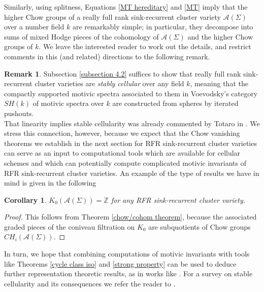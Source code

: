 \documentclass[11pt]{amsart}
\newtheorem{cor}[thm]{Corollary}
\theoremstyle{definition}
\newtheorem{rem}[thm]{Remark}
\theoremstyle{remark}
\numberwithin{equation}{section}
\begin{document}
Similarly, using splitness, Equations \ref{MT hereditary} and \ref{MT} imply that the higher Chow groups of a really full rank sink-recurrent cluster variety $\mathcal{A}(\Sigma)$ over a number field $k$ are remarkably simple; in particular, they decompose into sums of mixed Hodge pieces of the cohomology of $\mathcal{A}(\Sigma)$ and the higher Chow groups of $k$. We leave the interested reader to work out the details, and restrict comments in this (and related) directions to the following remark.

\begin{rem}
   Subsection \ref{subsection 4.2} suffices to show that really full rank sink-recurrent cluster varieties are \textit{stably cellular} over any field $k$, meaning that the compactly supported motivic spectra associated to them in Voevodsky's category $SH(k)$ of motivic spectra over $k$ are constructed from spheres by iterated pushouts.\\
    
    That linearity implies stable cellularity was already commented by Totaro in \cite{totaro2016motive}. We stress this connection, however, because we expect that the Chow vanishing theorems we establish in the next section for RFR sink-recurrent cluster varieties can serve as an input to computational tools which are available for cellular schemes and which can potentially compute complicated motivic invariants of RFR sink-recurrent cluster varieties. An example of the type of results we have in mind is given in the following
    
    \begin{cor}
        $K_0(\mathcal{A}(\Sigma)) = \mathbb{Z}$ for any RFR sink-recurrent cluster variety.
    \end{cor}
    
    \begin{proof}
        This follows from Theorem \ref{chow/cohom theorem}, because the associated graded pieces of the coniveau filtration on $K_0$ are subquotients of Chow groups $CH_i(\mathcal{A}(\Sigma))$.
    \end{proof}
    
    In turn, we hope that combining computations of motivic invariants with tools like Theorems \ref{cycle class iso} and \ref{strong property} can be used to deduce further representation theoretic results, as in works like \cite{barkley2026combinatorial}. For a survey on stable cellularity and its consequences we refer the reader to \cite{Hlavinka-REU}.
\end{rem}
\end{document}
